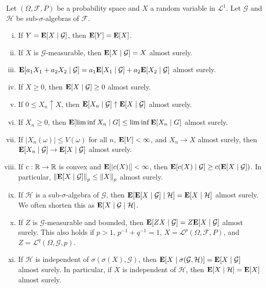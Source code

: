 \begin{lemma}
	Let $(\Omega,\mathcal{F},P)$ be a probability space and $X$ a random variable in $\mathcal{L}^1$. Let $\mathcal{G}$ and $\mathcal{H}$ be sub-$\sigma$-algebras of $\mathcal{F}$.
	\begin{enumerate}[(i)]
		\item If $Y=\textbf{E}[X\mid\mathcal{G}]$, then $\textbf{E}[Y]=\textbf{E}[X]$.
		\item If $X$ is $\mathcal{G}$-measurable, then $\textbf{E}[X\mid\mathcal{G}]=X$ almost surely.
		\item $\textbf{E}[a_1X_1 + a_2X_2\mid\mathcal{G}] = a_1\textbf{E}[X_1\mid\mathcal{G}] + a_2\textbf{E}[X_2\mid\mathcal{G}]$ almost surely.
		\item If $X\geq 0$, then $\textbf{E}[X\mid\mathcal{G}]\geq 0$ almost surely.
		\item If $0\leq X_n\uparrow X$, then $\textbf{E}[X_n\mid\mathcal{G}]\uparrow\textbf{E}[X\mid\mathcal{G}]$ almost surely.
		\item If $X_n\geq 0$, then $\textbf{E}[\liminf X_n\mid G] \leq \liminf \textbf{E}[X_n\mid G]$ almost surely.
		\item If $|X_n(\omega)|\leq V(\omega)$ for all $n$, $\textbf{E}[V]<\infty$, and $X_n\to X$ almost surely, then $\textbf{E}[X_n\mid\mathcal{G}] \to \textbf{E}[X\mid\mathcal{G}]$ almost surely.
		\item If $c:\mathbb{R}\to\mathbb{R}$ is convex and $\textbf{E}[|c(X)|]<\infty$, then $\textbf{E}[c(X)\mid\mathcal{G}] \geq c(\textbf{E}[X\mid\mathcal{G}])$. In particular, $\left\lVert\textbf{E}[X\mid\mathcal{G}]\right\rVert_p \leq \left\lVert X\right\rVert_p$ almost surely.
		\item If $\mathcal{H}$ is a sub-$\sigma$-algebra of $\mathcal{G}$, then $\textbf{E}[\textbf{E}[X\mid\mathcal{G}]\mid\mathcal{H}] = \textbf{E}[X\mid\mathcal{H}]$ almost surely. We often shorten this as $\textbf{E}[X\mid\mathcal{G}\mid\mathcal{H}]$.
		\item If $Z$ is $\mathcal{G}$-measurable and bounded, then $\textbf{E}[ZX\mid\mathcal{G}]=Z\textbf{E}[X\mid\mathcal{G}]$ almost surely. This also holds if $p>1$, $p^{-1}+q^{-1}=1$, $X=\mathcal{L}^p(\Omega,\mathcal{F},P)$, and $Z=\mathcal{L}^q(\Omega,\mathcal{G},p)$.
		\item If $\mathcal{H}$ is independent of $\sigma(\sigma(X),\mathcal{G})$, then $\textbf{E}[X\mid\sigma(\mathcal{G},\mathcal{H})] = \textbf{E}[X\mid\mathcal{G}]$ almost surely. In particular, if $X$ is independent of $\mathcal{H}$, then $\textbf{E}[X\mid\mathcal{H}]=\textbf{E}[X]$ almost surely.
	\end{enumerate}
\end{lemma}

